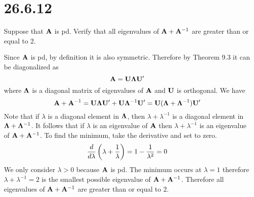 \section*{26.6.12}
Suppose that $\bf A$ is pd.
Verify that all eigenvalues of ${\bf A}+{\bf A}^{-1}$ are greater
than or equal to 2.

\bigskip
\noindent
Since $\bf A$ is pd, by definition it is also symmetric.
Therefore by Theorem 9.3 it can be diagonalized as
$${\bf A}={\bf U}{\bf\Lambda}{\bf U'}$$
where $\bf\Lambda$ is a diagonal matrix of eigenvalues of $\bf A$
and $\bf U$ is orthogonal.
We have
$${\bf A}+{\bf A}^{-1}={\bf U}{\bf\Lambda}{\bf U'}
+{\bf U}{\bf\Lambda}^{-1}{\bf U'}
={\bf U}({\bf\Lambda}+{\bf\Lambda}^{-1}){\bf U}'
$$
Note that if $\lambda$ is a diagonal element in $\bf\Lambda$,
then $\lambda+\lambda^{-1}$ is a diagonal element
in ${\bf\Lambda}+{\bf\Lambda}^{-1}$.
It follows that if $\lambda$ is an eigenvalue of $\bf A$ then
$\lambda+\lambda^{-1}$ is an eigenvalue of ${\bf A}+{\bf A}^{-1}$.
To find the minimum, take the derivative and set to zero.
$${d\over d\lambda}\left(\lambda+{1\over\lambda}\right)=
1-{1\over\lambda^2}=0$$
We only consider $\lambda>0$ because $\bf A$ is pd.
The minimum occurs at $\lambda=1$
therefore $\lambda+\lambda^{-1}=2$
is the smallest possible eigenvalue of ${\bf A}+{\bf A}^{-1}$.
Therefore all eigenvalues of ${\bf A}+{\bf A}^{-1}$ are greater
than or equal to 2.
